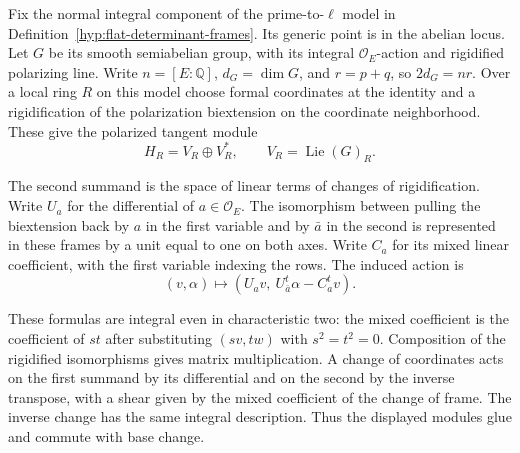Fix the normal integral component of the prime-to-\(\ell\) model in
Definition~\ref{hyp:flat-determinant-frames}. Its generic point is
in the abelian locus. Let \(G\) be its smooth semiabelian group,
with its integral \(\mathcal O_E\)-action and rigidified polarizing
line. Write \(n=[E:\mathbb Q]\), \(d_G=\dim G\), and
\(r=p+q\), so \(2d_G=nr\). Over a local ring \(R\) on this
model choose formal coordinates at the identity and a rigidification
of the polarization biextension on the coordinate neighborhood.
These give the polarized tangent module
\[
       H_R=V_R\oplus V_R^*,\qquad V_R=\operatorname{Lie}(G)_R .
\]

The second summand is the space of linear terms of changes of
rigidification. Write \(U_a\) for the differential of \(a\in
\mathcal O_E\). The isomorphism between pulling the biextension
back by \(a\) in the first variable and by \(\bar a\) in the
second is represented in these frames by a unit equal to one on
both axes. Write \(C_a\) for its mixed linear coefficient, with
the first variable indexing the rows. The induced action is
\[
       (v,\alpha)\longmapsto
       (U_av,\ U_{\bar a}^{t}\alpha-C_a^{t}v).
\]

These formulas are integral even in characteristic two: the mixed
coefficient is the coefficient of \(st\) after substituting
\((sv,tw)\) with \(s^2=t^2=0\). Composition of the rigidified
isomorphisms gives matrix multiplication. A change of coordinates
acts on the first summand by its differential and on the second by
the inverse transpose, with a shear given by the mixed coefficient
of the change of frame. The inverse change has the same integral
description. Thus the displayed modules glue and commute with
base change.

